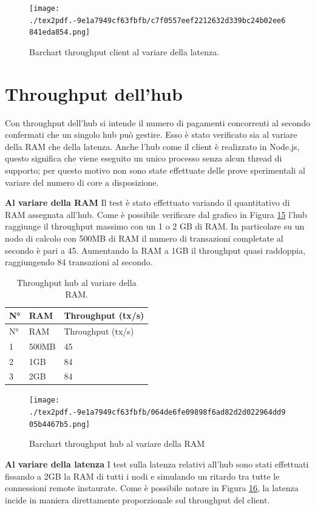 \documentclass[12pt,italian,]{book}
\begin{document}
\begin{figure}
\centering
\texttt{[image: ./tex2pdf.-9e1a7949cf63fbfb/c7f0557eef2212632d339bc24b02ee6841eda854.png]}
\caption{\protect\hypertarget{client-latenza-chart}{}{}Barchart throughput client al variare della latenza.}
\end{figure}

\hypertarget{throughput-dellhub}{%
\section{Throughput dell'hub}\label{throughput-dellhub}}

Con throughput dell'hub si intende il numero di pagamenti concorrenti al secondo confermati che un singolo hub può gestire. Esso è stato verificato sia al variare della RAM che della latenza. Anche l'hub come il client è realizzato in Node.js, questo significa che viene eseguito un unico processo senza alcun thread di supporto; per questo motivo non sono state effettuate delle prove sperimentali al variare del numero di core a disposizione.

\textbf{\textbf{Al variare della RAM}} Il test è stato effettuato variando il quantitativo di RAM assegnata all'hub. Come è possibile verificare dal grafico in Figura \protect\hyperlink{hub-ram-chart}{15} l'hub raggiunge il throughput massimo con un 1 o 2 GB di RAM. In particolare su un nodo di calcolo con 500MB di RAM il numero di transazioni completate al secondo è pari a 45. Aumentando la RAM a 1GB il throughput quasi raddoppia, raggiungendo 84 transazioni al secondo.

\begin{longtable}[]{@{}lll@{}}
\caption{\protect\hypertarget{hub-ram-table}{}{}Throughput hub al variare della RAM.}\tabularnewline
\toprule
N° & RAM & Throughput (tx/s)\tabularnewline
\midrule
\endfirsthead
\toprule
N° & RAM & Throughput (tx/s)\tabularnewline
\midrule
\endhead
1 & 500MB & 45\tabularnewline
2 & 1GB & 84\tabularnewline
3 & 2GB & 84\tabularnewline
\bottomrule
\end{longtable}

\begin{figure}
\centering
\texttt{[image: ./tex2pdf.-9e1a7949cf63fbfb/064de6fe09898f6ad82d2d022964dd905b4467b5.png]}
\caption{\protect\hypertarget{hub-ram-chart}{}{}Barchart throughput hub al variare della RAM}
\end{figure}

\textbf{\textbf{Al variare della latenza}} I test sulla latenza relativi all'hub sono stati effettuati fissando a 2GB la RAM di tutti i nodi e simulando un ritardo tra tutte le connessioni remote instaurate. Come è possibile notare in Figura \protect\hyperlink{hub-latenza-chart}{16}, la latenza incide in maniera direttamente proporzionale sul throughput del client.
\end{document}
